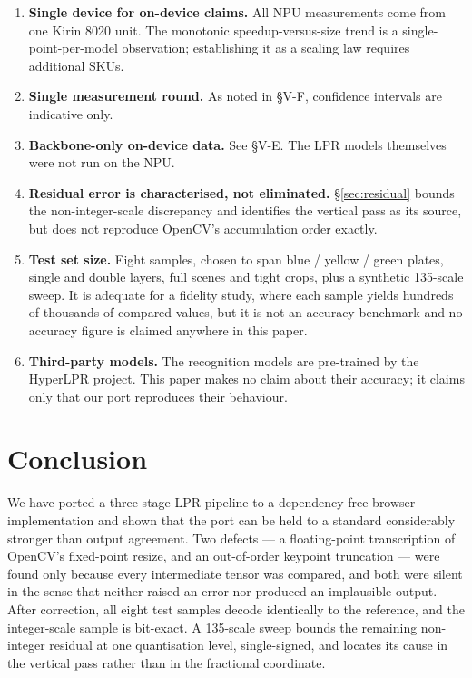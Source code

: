 \documentclass[journal]{IEEEtran}
\begin{document}
\begin{enumerate}
\item \textbf{Single device for on-device claims.} All NPU measurements come from
one Kirin 8020 unit. The monotonic speedup-versus-size trend is a
single-point-per-model observation; establishing it as a scaling law requires
additional SKUs.
\item \textbf{Single measurement round.} As noted in \S V-F, confidence intervals
are indicative only.
\item \textbf{Backbone-only on-device data.} See \S V-E. The LPR models
themselves were not run on the NPU.
\item \textbf{Residual error is characterised, not eliminated.}
\S\ref{sec:residual} bounds the non-integer-scale discrepancy and identifies the
vertical pass as its source, but does not reproduce OpenCV's accumulation order
exactly.
\item \textbf{Test set size.} Eight samples, chosen to span blue / yellow / green
plates, single and double layers, full scenes and tight crops, plus a synthetic
135-scale sweep. It is adequate for a fidelity study, where each sample yields
hundreds of thousands of compared values, but it is not an accuracy benchmark and
no accuracy figure is claimed anywhere in this paper.
\item \textbf{Third-party models.} The recognition models are pre-trained by the
HyperLPR project. This paper makes no claim about their accuracy; it claims only
that our port reproduces their behaviour.
\end{enumerate}

\section{Conclusion}

We have ported a three-stage LPR pipeline to a dependency-free browser
implementation and shown that the port can be held to a standard considerably
stronger than output agreement. Two defects --- a floating-point transcription of
OpenCV's fixed-point resize, and an out-of-order keypoint truncation --- were
found only because every intermediate tensor was compared, and both were silent
in the sense that neither raised an error nor produced an implausible output.
After correction, all eight test samples decode identically to the reference, and
the integer-scale sample is bit-exact. A 135-scale sweep bounds the remaining
non-integer residual at one quantisation level, single-signed, and locates its
cause in the vertical pass rather than in the fractional coordinate.
\end{document}

